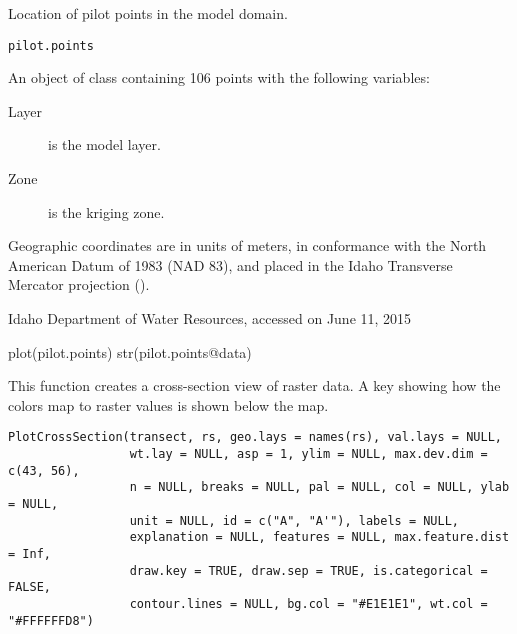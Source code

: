 \documentclass[letterpaper]{book}
\begin{document}
%
\begin{Description}\relax
Location of pilot points in the model domain.
\end{Description}
%
\begin{Usage}
\begin{verbatim}
pilot.points
\end{verbatim}
\end{Usage}
%
\begin{Format}
An object of  class containing 106 points with the following variables:
\begin{description}

\item[Layer] is the model layer.
\item[Zone] is the kriging zone.

\end{description}

Geographic coordinates are in units of meters, in conformance with the North American Datum of 1983 (NAD 83), and placed in the
Idaho Transverse Mercator projection ().
\end{Format}
%
\begin{Source}\relax
Idaho Department of Water Resources, accessed on June 11, 2015
\end{Source}
%
\begin{SeeAlso}\relax
{}
\end{SeeAlso}
%
\begin{Examples}
\begin{ExampleCode}
plot(pilot.points)
str(pilot.points@data)
\end{ExampleCode}
\end{Examples}
%
\begin{Description}\relax
This function creates a cross-section view of raster data.
A key showing how the colors map to raster values is shown below the map.
\end{Description}
%
\begin{Usage}
\begin{verbatim}
PlotCrossSection(transect, rs, geo.lays = names(rs), val.lays = NULL,
                 wt.lay = NULL, asp = 1, ylim = NULL, max.dev.dim = c(43, 56),
                 n = NULL, breaks = NULL, pal = NULL, col = NULL, ylab = NULL,
                 unit = NULL, id = c("A", "A'"), labels = NULL,
                 explanation = NULL, features = NULL, max.feature.dist = Inf,
                 draw.key = TRUE, draw.sep = TRUE, is.categorical = FALSE,
                 contour.lines = NULL, bg.col = "#E1E1E1", wt.col = "#FFFFFFD8")
\end{verbatim}
\end{Usage}
\end{document}
